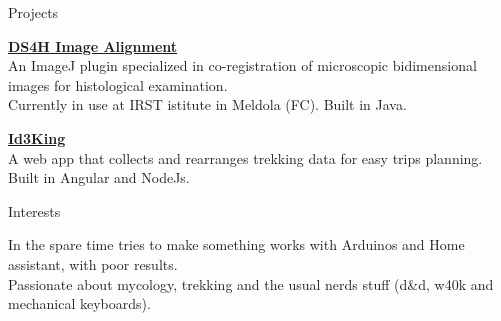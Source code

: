 \documentclass{resume} %
\begin{document}
\begin{rSection}{Projects}

{\bf \href{https://imagej.net/plugins/ds4h-image-alignment}{DS4H Image Alignment}}
\\ An ImageJ plugin specialized in co-registration of microscopic bidimensional images for histological examination.\\
Currently in use at IRST istitute in Meldola (FC). Built in Java.

{\bf \href{https://github.com/illeb/id3king}{Id3King}}
\\ A web app that collects and rearranges trekking data for easy trips planning.\\
Built in Angular and NodeJs.

\end{rSection}


\begin{rSection}{Interests}

  In the spare time tries to make something works with Arduinos and Home assistant, with poor results. \\Passionate about mycology, trekking and the usual nerds stuff (d\&d, w40k and mechanical
 keyboards).
\end{rSection}
\end{document}
